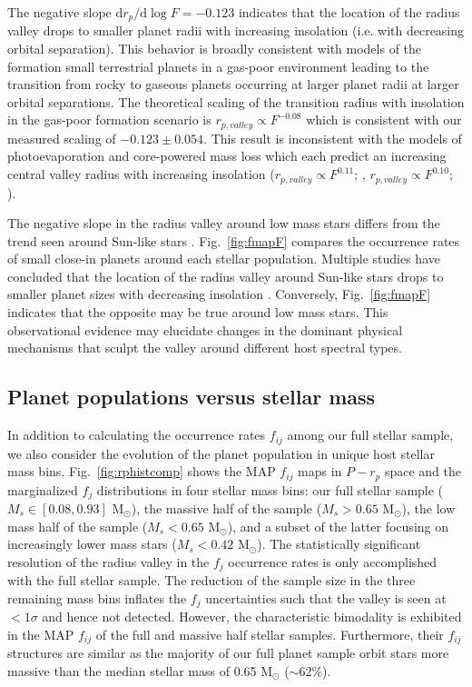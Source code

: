 \documentclass[twocolumn]{emulateapj}
\begin{document}
The negative slope $\text{d}r_p / \text{d}\log{F} = -0.123$ indicates that the location of the radius valley
drops to smaller planet radii with increasing insolation (i.e. with decreasing orbital separation). This behavior
is broadly consistent with models of the formation small terrestrial planets in a gas-poor environment
\citep{lee14,lee16,lopez18} leading to the transition from rocky to gaseous planets occurring at larger planet
radii at larger orbital separations. The theoretical scaling of the transition
radius with insolation in the gas-poor formation scenario is $r_{p,valley} \propto F^{-0.08}$
\citep{lopez18} which is
consistent with our measured scaling of $-0.123\pm 0.054$. This result is inconsistent with the
models of photoevaporation and core-powered mass loss which each predict an increasing central valley
radius with increasing insolation ($r_{p,valley} \propto F^{0.11}$; \citealt{lopez18},  
$r_{p,valley} \propto F^{0.10}$; \citealt{gupta19b}).

The negative slope in the radius valley around low mass stars differs from the trend seen around
Sun-like stars \citep{fulton17}. Fig.~\ref{fig:fmapF} compares the occurrence rates of small close-in
planets around each stellar population. Multiple studies have concluded that the location of the
radius valley around Sun-like stars drops to smaller planet sizes with decreasing insolation
\citep[e.g.][]{vaneylen18,martinez19}. Conversely, Fig.~\ref{fig:fmapF} indicates that the opposite
may be true around low mass stars. This observational evidence may elucidate changes in the dominant
physical mechanisms that sculpt the valley around different host spectral types.


\subsection{Planet populations versus stellar mass} \label{sect:Msbin}
In addition to calculating the occurrence rates $f_{ij}$ among our full stellar sample, we also consider
the evolution of the planet population in unique host stellar mass bins. Fig.~\ref{fig:rphistcomp} shows
the MAP $f_{ij}$ maps in $P-r_p$ space and the marginalized $f_j$ distributions in four stellar mass bins:
our full stellar sample
($M_s \in [0.08,0.93]$ M$_{\odot}$), the massive half of the sample ($M_s>0.65$ M$_{\odot}$),  
the low mass half of the sample ($M_s<0.65$ M$_{\odot}$), and a subset of the latter focusing on
increasingly lower mass stars ($M_s<0.42$ M$_{\odot}$). The statistically significant resolution of the
radius valley in the $f_j$ occurrence rates is only accomplished with the full stellar sample. The reduction
of the sample size in the three remaining mass bins inflates the $f_j$ uncertainties such that the valley
is seen at $<1\sigma$ and hence not detected. However, the characteristic bimodality is exhibited in the
MAP $f_{ij}$ of the full and massive half stellar samples. Furthermore, their $f_{ij}$ structures are similar
as the majority of our full planet sample orbit stars more massive than the median stellar mass of 0.65
M$_{\odot}$ ($\sim 62$\%).
\end{document}
